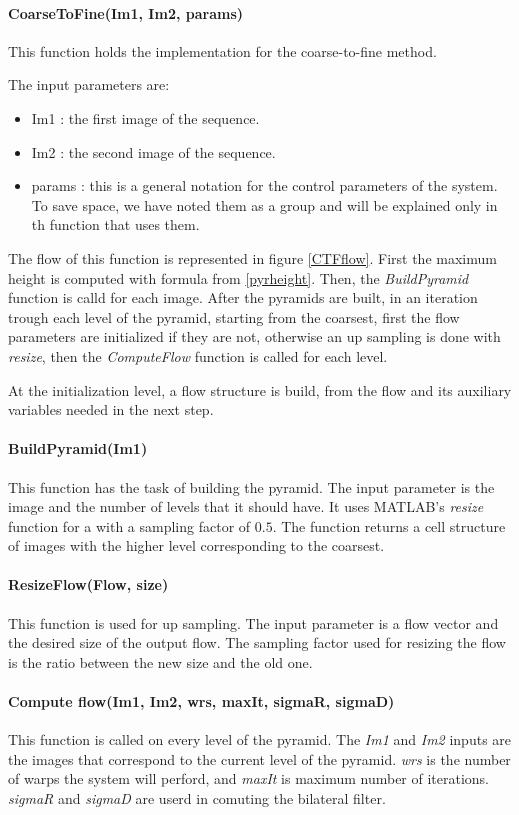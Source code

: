 \documentclass[12pt,a4paper,twoside]{report}
\begin{document}
{\paragraph{CoarseToFine(Im1, Im2, params)} This function holds the implementation for the coarse-to-fine method. 

The input parameters are:
\begin{itemize}
	\item Im1 : the first image of the sequence.
	\item Im2 : the second image of the sequence.
	\item params : this is a general notation for the control parameters of the system. To save space, we have noted them as a group and will be explained only in th function that uses them. 
\end{itemize}

The flow of this function is represented in figure \ref{CTFflow}. First the maximum height is computed with formula from \ref{pyrheight}. Then, the \textit{BuildPyramid} function is calld for each image. After the pyramids are built, in an iteration trough each level of the pyramid, starting from the coarsest, first the flow parameters are initialized if they are not, otherwise an up sampling is done with \textit{resize}, then the \textit{ComputeFlow} function is called for each level. 

At the initialization level, a flow structure is build, from the flow and its auxiliary variables needed in the next step.

\paragraph{BuildPyramid(Im1)} This function has the task of building the pyramid. The input parameter is the image and the number of levels that it should have. It uses  MATLAB's \textit{resize} function for a with a sampling factor of $0.5$. The function returns a cell structure of images with the higher level corresponding to the coarsest.

\paragraph{ResizeFlow(Flow, size)}
This function is used for up sampling. The input parameter is a flow vector and the desired size of the output flow. The sampling factor used for resizing the flow is the ratio between the new size and the old one. 

\paragraph{Compute flow(Im1, Im2, wrs, maxIt, sigmaR, sigmaD)} This function is called on every level of the pyramid. The \textit{Im1} and \textit{Im2} inputs are the images that correspond to the current level of the pyramid. \textit{wrs} is the number of warps the system will perford, and \textit{maxIt} is maximum number of iterations. \textit{sigmaR} and \textit{sigmaD} are userd in comuting the bilateral filter.

}
\end{document}
